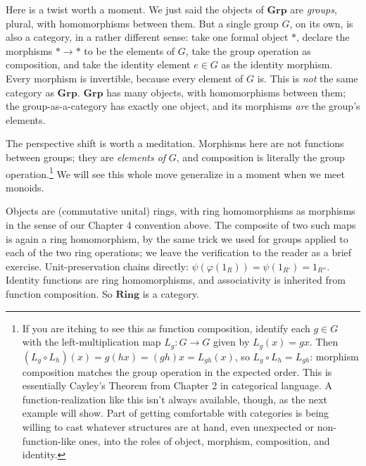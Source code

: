 \begin{remark}
Here is a twist worth a moment. We just said the objects of $\mathbf{Grp}$ are
\textit{groups}, plural, with homomorphisms between them. But a single group $G$,
on its own, is also a category, in a rather different sense: take one formal
object $*$, declare the morphisms $* \to *$ to be the elements of $G$, take the
group operation as composition, and take the identity element $e \in G$ as the
identity morphism. Every morphism is invertible, because every element of $G$ is.
This is \textit{not} the same category as $\mathbf{Grp}$. $\mathbf{Grp}$ has many
objects, with homomorphisms between them; the group-as-a-category has exactly one
object, and its morphisms \textit{are} the group's elements.

The perspective shift is worth a meditation. Morphisms here are not functions
between groups; they are \textit{elements of} $G$, and composition is literally
the group operation.\footnote{If you are itching to see this as function
composition, identify each $g \in G$ with the left-multiplication map
$L_g : G \to G$ given by $L_g(x) = gx$. Then $(L_g \circ L_h)(x) = g(hx) = (gh)x
= L_{gh}(x)$, so $L_g \circ L_h = L_{gh}$: morphism composition matches the
group operation in the expected order. This is essentially Cayley's Theorem from
Chapter 2 in categorical language. A function-realization like this
isn't always available, though, as the next example will show. Part of getting
comfortable with categories is being willing to cast whatever structures are at
hand, even unexpected or non-function-like ones, into the roles of object,
morphism, composition, and identity.} We will see this whole move generalize in a
moment when we meet monoids.
\end{remark}

\begin{example}
Objects are (commutative unital) rings, with ring homomorphisms as morphisms in the
sense of our Chapter 4 convention above. The composite of two such maps is again a
ring homomorphism, by the same trick we used for groups applied to each of the two
ring operations; we leave the verification to the reader as a brief exercise.
Unit-preservation chains directly:
$\psi(\varphi(1_R)) = \psi(1_{R'}) = 1_{R''}$. Identity functions are ring
homomorphisms, and associativity is inherited from function composition. So
$\mathbf{Ring}$ is a category.
\end{example}

